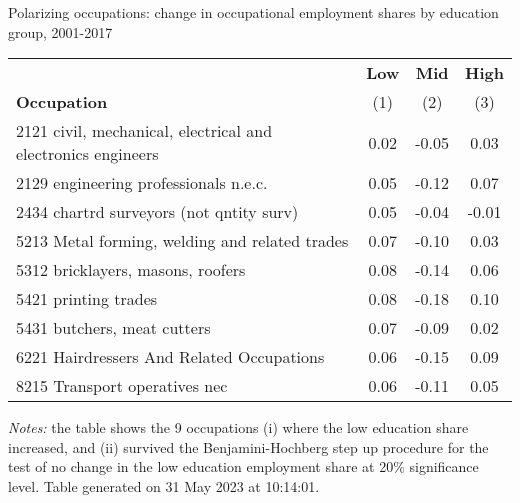 \begin{center}
\begin{threeparttable}[!h]
\caption{Polarizing occupations: change in occupational employment shares by education group, 2001-2017}
\label{tab:pol_occ}
\begin{tabular}{lccc}
\toprule
\toprule
&\multicolumn{1}{c}{\textbf{Low}}&\multicolumn{1}{c}{\textbf{Mid}}&\multicolumn{1}{c}{\textbf{High}} \\
\textbf{Occupation}&\multicolumn{1}{c}{(1)}&\multicolumn{1}{c}{(2)}&\multicolumn{1}{c}{(3)} \\
\midrule
2121 civil, mechanical, electrical and electronics engineers&        0.02&       -0.05&        0.03\\
2129 engineering professionals n.e.c.&        0.05&       -0.12&        0.07\\
2434 chartrd surveyors (not qntity surv)&        0.05&       -0.04&       -0.01\\
5213 Metal forming, welding and related trades&        0.07&       -0.10&        0.03\\
5312 bricklayers, masons, roofers&        0.08&       -0.14&        0.06\\
5421 printing trades&        0.08&       -0.18&        0.10\\
5431 butchers, meat cutters&        0.07&       -0.09&        0.02\\
6221 Hairdressers And Related Occupations&        0.06&       -0.15&        0.09\\
8215 Transport operatives nec&        0.06&       -0.11&        0.05\\
\bottomrule
\bottomrule
\end{tabular}
\begin{tablenotes}
\item \footnotesize \textit{Notes:} the table shows the 9 occupations (i) where the low education share increased, and (ii) survived the Benjamini-Hochberg step up procedure for the test of no change in the low education employment share at 20\% significance level. Table generated on 31 May 2023 at 10:14:01.
\end{tablenotes}
\end{threeparttable}
\end{center}

